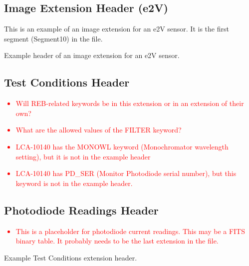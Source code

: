 \documentclass{article}[12pt]
\newcommand{\red}{\textcolor{red}}
\begin{document}
\subsection{Image Extension Header (e2V)}

This is an example of an image extension for an e2V sensor.  It is the first segment (Segment10) in the file.

\begin{table}
\tiny
\begin{alltt}

\end{alltt}
\caption{Example header of an image extension for an e2V sensor.\label{tab:image_e2V}}
\end{table}

\subsection{Test Conditions Header}

\red{
\begin{itemize}
\item{Will REB-related keywords be in this extension or in an extension of their own?}
\item{What are the allowed values of the FILTER keyword?}
\item{LCA-10140 has the MONOWL keyword (Monochromator wavelength setting), but it is not in the example header}
\item{LCA-10140 has PD\_SER (Monitor Photodiode serial number), but this keyword is not in the example header.}
\end{itemize}
}

\subsection{Photodiode Readings Header}

\red{
\begin{itemize}
\item{This is a placeholder for photodiode current readings.  This may be a FITS binary table.  It probably needs to be the last extension in the file.}
\end{itemize}
}

\begin{table}
\begin{alltt}

\end{alltt}
\caption{Example Test Conditions extension header.\label{table:test_cond}}
\end{table}
\end{document}

